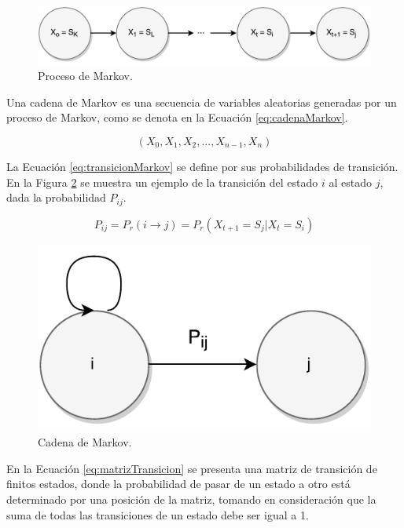 \begin{figure}[ht!]
  \centering
    \includegraphics[scale=0.6]{images/ProcesoMarkov.pdf}
  \caption{Proceso de Markov.}
  \label{fig:procesoMarkov}
\end{figure}

Una cadena de Markov es una secuencia de variables aleatorias generadas por un proceso de Markov, como se denota en la Ecuación \ref{eq:cadenaMarkov}.

\begin{equation} \label{eq:cadenaMarkov}
	(X_0, X_1, X_2, ..., X_{n-1}, X_{n})
\end{equation}

La Ecuación \ref{eq:transicionMarkov} se define por sus probabilidades de transición. En la Figura \ref{fig:cadenaMarkov} se muestra un ejemplo de la transición del estado $i$ al estado $j$, dada la probabilidad $P_{ij}$.

\begin{equation} \label{eq:transicionMarkov}
	P_{ij} = P_r(i \rightarrow j) = P_r(X_{t+1} = S_j | X_t = S_i)
\end{equation}

\begin{figure}[ht!]
  \centering
    \includegraphics[scale=0.6]{images/CadenaMarkov.pdf}
  \caption{Cadena de Markov.}
  \label{fig:cadenaMarkov}
\end{figure}

En la Ecuación \ref{eq:matrizTransicion} se presenta una matriz de transición de finitos estados, donde la probabilidad de pasar de un estado a otro está determinado por una posición de la matriz, tomando en consideración que la suma de todas las transiciones de un estado debe ser igual a 1.

